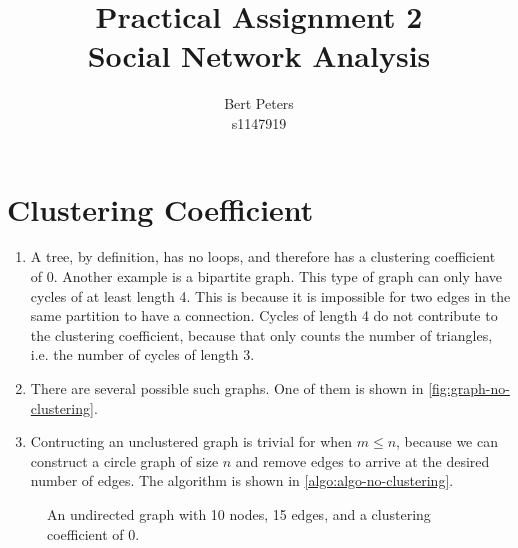 \documentclass[a4paper,10pt,hidelinks]{article}
\title{Practical Assignment 2\\
Social Network Analysis}
\author{Bert Peters\\
s1147919}
\begin{document}
\maketitle

\section{Clustering Coefficient}

\begin{enumerate}
 \item A tree, by definition, has no loops, and therefore has a clustering coefficient of 0. Another example is a bipartite graph. This type of graph can only have cycles of at least length 4. This is because it is impossible for two edges in the same partition to have a connection. Cycles of length 4 do not contribute to the clustering coefficient, because that only counts the number of triangles, i.e. the number of cycles of length 3.

 \item There are several possible such graphs. One of them is shown in \autoref{fig:graph-no-clustering}.
 
 \item Contructing an unclustered graph is trivial for when $m \leq n$, because we can construct a circle graph of size $n$ and remove edges to arrive at the desired number of edges. The algorithm is shown in \autoref{algo:algo-no-clustering}.
\end{enumerate}

\begin{figure}
    \centering
    \caption{An undirected graph with 10 nodes, 15 edges, and a clustering coefficient of 0.}
    \label{fig:graph-no-clustering}
\end{figure}
\end{document}
